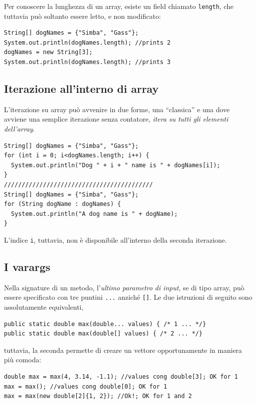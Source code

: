 \documentclass[\fontsizeclass,twocolumn]{\classname}
\theoremstyle{definition}
\theoremstyle{definition}
\begin{document}
Per conoscere la lunghezza di un array, esiste un field chiamato
\texttt{length}, che tuttavia può soltanto essere letto, e non modificato:

\begin{lstlisting}
String[] dogNames = {"Simba", "Gass"};
System.out.println(dogNames.length); //prints 2
dogNames = new String[3];
System.out.println(dogNames.length); //prints 3
\end{lstlisting}

\subsection{Iterazione all'interno di array}

L'iterazione su array può avvenire in due forme, una ``classica'' e una dove
avviene una semplice iterazione senza contatore, \emph{itera su tutti gli
elementi dell'array}.

\begin{lstlisting}
String[] dogNames = {"Simba", "Gass"};
for (int i = 0; i<dogNames.length; i++) {
  System.out.println("Dog " + i + " name is " + dogNames[i]);
}
//////////////////////////////////////////
String[] dogNames = {"Simba", "Gass"};
for (String dogName : dogNames) {
  System.out.println("A dog name is " + dogName);
}
\end{lstlisting}

L'indice \texttt{i}, tuttavia, non è disponibile all'interno della seconda
iterazione.

\subsection{I varargs}

Nella signature di un metodo, l'\emph{ultimo parametro di input}, se di tipo
array, può essere specificato con tre puntini \texttt{...} anziché \texttt{[]}.
Le due istruzioni di seguito sono assolutamente equivalenti,

\begin{lstlisting}
public static double max(double... values) { /* 1 ... */}
public static double max(double[] values) { /* 2 ... */}
\end{lstlisting}

tuttavia, la seconda permette di creare un vettore opportunamente in maniera
più comoda:

\begin{lstlisting}
double max = max(4, 3.14, -1.1); //values cong double[3]; OK for 1
max = max(); //values cong double[0]; OK for 1
max = max(new double[2]{1, 2}); //Ok!; OK for 1 and 2
\end{lstlisting}
\end{document}

